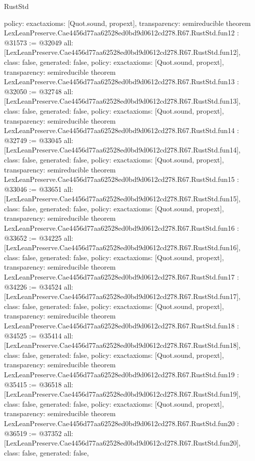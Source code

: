 \begin{lexlean}{RustStd}
\begin{coremodule}
{  policy: exact{axioms: [Quot.sound, propext]},
  transparency: semireducible
}
theorem LexLeanPreserve.Cae4456d77aa62528ed0bd9d0612cd278.R67.RustStd.fun12 : @31573 := @32049 {
  all: [LexLeanPreserve.Cae4456d77aa62528ed0bd9d0612cd278.R67.RustStd.fun12],
  class: false,
  generated: false,
  policy: exact{axioms: [Quot.sound, propext]},
  transparency: semireducible
}
theorem LexLeanPreserve.Cae4456d77aa62528ed0bd9d0612cd278.R67.RustStd.fun13 : @32050 := @32748 {
  all: [LexLeanPreserve.Cae4456d77aa62528ed0bd9d0612cd278.R67.RustStd.fun13],
  class: false,
  generated: false,
  policy: exact{axioms: [Quot.sound, propext]},
  transparency: semireducible
}
theorem LexLeanPreserve.Cae4456d77aa62528ed0bd9d0612cd278.R67.RustStd.fun14 : @32749 := @33045 {
  all: [LexLeanPreserve.Cae4456d77aa62528ed0bd9d0612cd278.R67.RustStd.fun14],
  class: false,
  generated: false,
  policy: exact{axioms: [Quot.sound, propext]},
  transparency: semireducible
}
theorem LexLeanPreserve.Cae4456d77aa62528ed0bd9d0612cd278.R67.RustStd.fun15 : @33046 := @33651 {
  all: [LexLeanPreserve.Cae4456d77aa62528ed0bd9d0612cd278.R67.RustStd.fun15],
  class: false,
  generated: false,
  policy: exact{axioms: [Quot.sound, propext]},
  transparency: semireducible
}
theorem LexLeanPreserve.Cae4456d77aa62528ed0bd9d0612cd278.R67.RustStd.fun16 : @33652 := @34225 {
  all: [LexLeanPreserve.Cae4456d77aa62528ed0bd9d0612cd278.R67.RustStd.fun16],
  class: false,
  generated: false,
  policy: exact{axioms: [Quot.sound, propext]},
  transparency: semireducible
}
theorem LexLeanPreserve.Cae4456d77aa62528ed0bd9d0612cd278.R67.RustStd.fun17 : @34226 := @34524 {
  all: [LexLeanPreserve.Cae4456d77aa62528ed0bd9d0612cd278.R67.RustStd.fun17],
  class: false,
  generated: false,
  policy: exact{axioms: [Quot.sound, propext]},
  transparency: semireducible
}
theorem LexLeanPreserve.Cae4456d77aa62528ed0bd9d0612cd278.R67.RustStd.fun18 : @34525 := @35414 {
  all: [LexLeanPreserve.Cae4456d77aa62528ed0bd9d0612cd278.R67.RustStd.fun18],
  class: false,
  generated: false,
  policy: exact{axioms: [Quot.sound, propext]},
  transparency: semireducible
}
theorem LexLeanPreserve.Cae4456d77aa62528ed0bd9d0612cd278.R67.RustStd.fun19 : @35415 := @36518 {
  all: [LexLeanPreserve.Cae4456d77aa62528ed0bd9d0612cd278.R67.RustStd.fun19],
  class: false,
  generated: false,
  policy: exact{axioms: [Quot.sound, propext]},
  transparency: semireducible
}
theorem LexLeanPreserve.Cae4456d77aa62528ed0bd9d0612cd278.R67.RustStd.fun20 : @36519 := @37352 {
  all: [LexLeanPreserve.Cae4456d77aa62528ed0bd9d0612cd278.R67.RustStd.fun20],
  class: false,
  generated: false,
}
\end{coremodule}
\end{lexlean}
